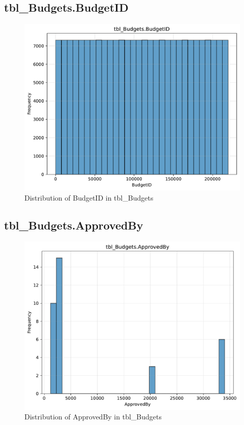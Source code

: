 \subsection{tbl\_Budgets.BudgetID}

\begin{figure}[htbp]
\centering
\includegraphics[width=\textwidth]{figures/dbo_tbl_Budgets_BudgetID.pdf}
\caption{Distribution of BudgetID in tbl\_Budgets}
\end{figure}\newpage

\subsection{tbl\_Budgets.ApprovedBy}

\begin{figure}[htbp]
\centering
\includegraphics[width=\textwidth]{figures/dbo_tbl_Budgets_ApprovedBy.pdf}
\caption{Distribution of ApprovedBy in tbl\_Budgets}
\end{figure}\newpage

